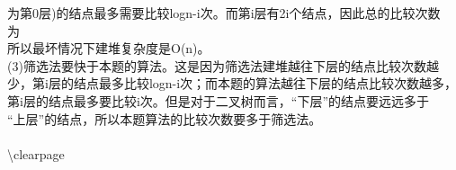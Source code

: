 \begin{question}
\begin{solution}
为第0层)的结点最多需要比较logn-i次。而第i层有2i个结点，因此总的比较次数\\
为\\
所以最坏情况下建堆复杂度是O(n)。\\
(3)筛选法要快于本题的算法。这是因为筛选法建堆越往下层的结点比较次数越\\
少，第i层的结点最多比较logn-i次；而本题的算法越往下层的结点比较次数越多，\\
第i层的结点最多要比较i次。但是对于二叉树而言，“下层”的结点要远远多于\\
“上层”的结点，所以本题算法的比较次数要多于筛选法。\\
\\
\textbackslash{}clearpage\\


\end{solution}
\end{question}
